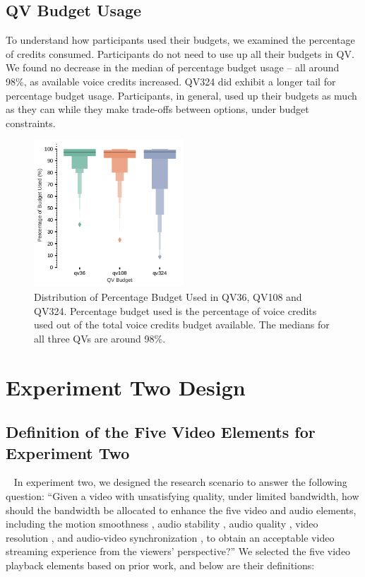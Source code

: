 \subsection{QV Budget Usage}
To understand how participants used their budgets, we examined the percentage of credits consumed. Participants do not need to use up all their budgets in QV. We found no decrease in the median of percentage budget usage -- all around 98\%, as available voice credits increased. QV324 did exhibit a longer tail for percentage budget usage. Participants, in general, used up their budgets as much as they can while they make trade-offs between options, under budget constraints.
\begin{figure}[htpb]
    \centering
    \includegraphics[width=0.5\textwidth, keepaspectratio=true]{content/image/qv_budget_used_distribution.pdf}
    \caption{
      Distribution of Percentage Budget Used in QV36, QV108 and QV324. Percentage budget used is the percentage of voice credits used out of the total voice credits budget available. The medians for all three QVs are around 98\%.
    }
    \label{fig:qv_budget_exp1}
\end{figure}


\section{Experiment Two Design}
\subsection{Definition of the Five Video Elements for Experiment Two}~\label{elem_def}
In experiment two, we designed the research scenario to answer the following question: ``Given a video with unsatisfying quality, under limited bandwidth, how should the bandwidth be allocated to enhance the five video and audio elements, including the motion smoothness \cite{huynh2008temporal}, audio stability \cite{hardman1998successful}, audio quality \cite{knoche2008low}, video resolution \cite{knoche2005can}, and audio-video synchronization \cite{steinmetz1996human}, to obtain an acceptable video streaming experience from the viewers' perspective?'' We selected the five video playback elements based on prior work, and below are their definitions: 

